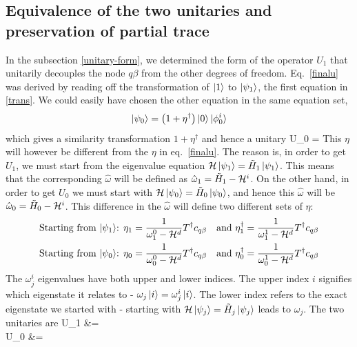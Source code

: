 \documentclass[12pt,twoside]{report}
\numberwithin{equation}{section}
\begin{document}
\subsection{Equivalence of the two unitaries and preservation of partial trace}
In the subsection \ref{unitary-form}, we determined the form of the operator \(U_1\) that unitarily decouples the node \(q\beta\) from the other degrees of freedom. Eq.~\ref{finalu} was derived by reading off the transformation of \(\ket{1}\) to \(\ket{\psi_1}\), the first equation in \ref{trans}. We could easily have chosen the other equation in the same equation set,
\begin{gather*}
\ket{\psi_0} = \left({1 + {\eta}^\dagger}\right)\ket{0}\ket{\phi_0^i}
\end{gather*}
which gives a similarity  transformation \(1+\eta^\dagger\) and hence a unitary
\beq
U_0 = 
\eeq
This \(\eta\) will however be different from the \(\eta\) in eq.~\ref{finalu}. The reason is, in order to get \(U_1\), we must start from the eigenvalue equation \(\mathcal{H} \ket{\psi_1} = \tilde H_1 \ket{\psi_1}\). This means that the corresponding \(\hat \omega\) will be defined as \(\hat \omega_1 = \tilde H_1 - \mathcal{H}^i\). On the other hand, in order to get \(U_0\) we must start with \(\mathcal{H} \ket{\psi_0} = \tilde H_0 \ket{\psi_0}\), and hence this \(\hat \omega\) will be \(\hat \omega_0 = \tilde H_0 - \mathcal{H}^i\). This difference in the \(\hat \omega\) will define two different sets of \(\eta\):
\begin{equation}\begin{aligned}
	\label{eta0}
\text{Starting from \(\ket{\psi_1}\):	}\eta_1 = \frac{1}{\omega_1^0- \mathcal{H}^d}T^\dagger c_{q\beta} && \text{and }\eta^\dagger_1 = \frac{1}{\omega_1^1- \mathcal{H}^d}T^\dagger c_{q\beta}\\
\text{Starting from \(\ket{\psi_0}\):	}\eta_0 = \frac{1}{\omega_0^0- \mathcal{H}^d}T^\dagger c_{q\beta} && \text{and }\eta^\dagger_0 = \frac{1}{\omega_0^1- \mathcal{H}^d}T^\dagger c_{q\beta}
\end{aligned}\end{equation}
The \(\omega_j^i\) eigenvalues have both upper and lower indices. The upper index \(i\) signifies which eigenstate it relates to - \(\omega_j \ket{i} = \omega_j^i\ket{i}\). The lower index refers to the exact eigenstate we started with - starting with \(\mathcal{H} \ket{\psi_j} = \tilde H_j\ket{\psi_j}\) leads to \(\omega_j\). The two unitaries are
\beq
U_1 &= \\
U_0 &= 
\end{document}
